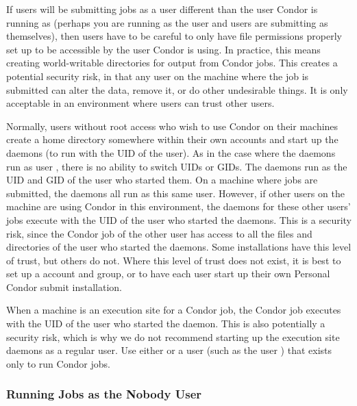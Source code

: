If users will be submitting jobs as a user different than the user
Condor is running as (perhaps you are running as the  user and
users are submitting as themselves), then users have to be careful to
only have file permissions properly set up to be accessible by the
user Condor is using. In practice, this means creating world-writable
directories for output from Condor jobs.  This creates a potential
security risk, in that any user on the machine where the job is
submitted can alter the data, remove it, or do other undesirable
things.  It is only acceptable in an environment where users can trust
other users.

Normally, users without root access who wish to use Condor on their
machines create a  home directory somewhere within their
own accounts and start up the daemons (to run with the UID of the
user).  As in the case where the daemons run as user , there is
no ability to switch UIDs or GIDs.  The daemons run as the UID and GID
of the user who started them.  On a machine where jobs are submitted,
the  daemons all run as this same user.  However, if
other users on the machine are using Condor in this environment, the
 daemons for these other users' jobs execute with the
UID of the user who started the daemons.  This is a security risk,
since the Condor job of the other user has access to all the files and
directories of the user who started the daemons.  Some installations
have this level of trust, but others do not.  Where this level of
trust does not exist, it is best to set up a  account and group,
or to have each user start up their own Personal Condor submit
installation.

When a machine is an execution site for a Condor job, the Condor job
executes with the UID of the user who started the 
daemon.  This is also potentially a security risk, which is why we do
not recommend starting up the execution site daemons as a regular
user.  Use either  or a user
(such as the user ) that exists
only to run Condor jobs.

\subsubsection{\label{sec:RunAsNobody}Running Jobs as the Nobody User}


